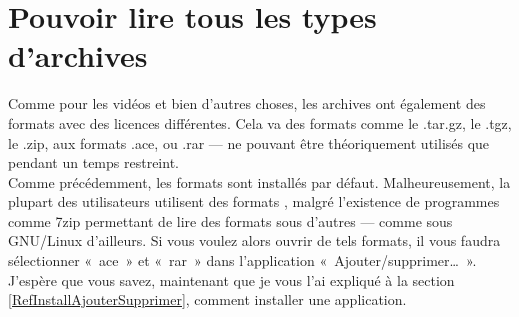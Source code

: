 \section{Pouvoir lire tous les types d'archives}
Comme pour les vidéos et bien d'autres choses, les archives ont également des formats avec des licences différentes. Cela va des formats  comme le .tar.gz, le .tgz, le .zip, aux formats  .ace, ou .rar --- ne pouvant être théoriquement utilisés que pendant un temps restreint.\\
Comme précédemment, les formats  sont installés par défaut. Malheureusement, la plupart des utilisateurs utilisent des formats , malgré l'existence de programmes comme 7zip permettant de lire des formats  sous d'autres  --- comme sous GNU/Linux d'ailleurs. Si vous voulez alors ouvrir de tels formats, il vous faudra sélectionner «~ace~» et «~rar~» dans l'application «~Ajouter/supprimer\dots{}~». J'espère que vous savez, maintenant que je vous l'ai expliqué à la section \ref{RefInstallAjouterSupprimer}, comment installer une application.
